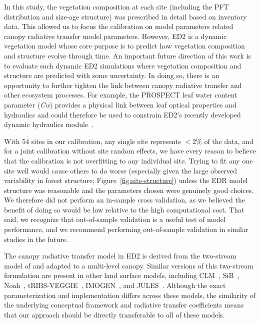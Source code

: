 In this study, the vegetation composition at each site (including the PFT distribution and size-age structure) was prescribed in detail based on inventory data.
This allowed us to focus the calibration on model parameters related canopy radiative transfer model parameters.
However, ED2 is a dynamic vegetation model whose core purpose is to predict how vegetation composition and structure evolve through time.
An important future direction of this work is to evaluate such dynamic ED2 simulations where vegetation composition and structure are predicted with some uncertainty.
In doing so, there is an opportunity to further tighten the link between canopy radiative transfer and other ecosystem processes.
For example, the PROSPECT leaf water content parameter (\emph{Cw}) provides a physical link between leaf optical properties and hydraulics and could therefore be used to constrain ED2's recently developed dynamic hydraulics module~\citep{xu2021leaf}.

With 54 sites in our calibration, any single site represents $<2\%$ of the data, and for a joint calibration without site random effects, we have every reason to believe that the calibration is not overfitting to any individual site.
Trying to fit any one site well would cause others to do worse (especially given the large observed variability in forest structure; Figure~\ref{fig:site-structure}) unless the EDR model structure was reasonable and the parameters chosen were genuinely good choices.
We therefore did not perform an in-sample cross validation, as we believed the benefit of doing so would be low relative to the high computational cost.
That said, we recognize that out-of-sample validation is a useful test of model performance, and we recommend performing out-of-sample validation in similar studies in the future.

The canopy radiative transfer model in ED2 is derived from the two-stream model of \citet{sellers1985canopy} and adapted to a multi-level canopy.
Similar versions of this two-stream formulation are present in other land surface models, including CLM~\citep{clm45_note}, SiB~\citep{baker2008seasonal}, Noah~\citep{niu2011community}, tRIBS-VEGGIE~\citep{ivanov2008vegetationhydrology}, IMOGEN~\citep{huntingford2008quantifying}, and JULES~\citep{best_2011_joint}.
Although the exact parameterization and implementation differs across these models, the similarity of the underlying conceptual framework and radiative transfer coefficients means that our approach should be directly transferable to all of these models.

